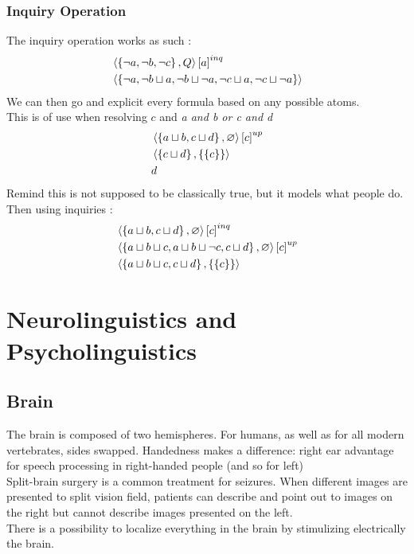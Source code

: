 \documentclass{cours}
\begin{document}
\subsubsection{Inquiry Operation}

The inquiry operation works as such :
\[
    \begin{aligned}
         & \left\langle \left\{\lnot a, \lnot b, \lnot c\right\}, Q \right\rangle\left[a\right]^{inq}                                            \\
         & \left\langle \left\{\lnot a, \lnot b \sqcup a, \lnot b \sqcup \lnot a, \lnot c \sqcup a, \lnot c \sqcup \lnot a\right\} \right\rangle
    \end{aligned}
\]
We can then go and explicit every formula based on any possible atoms. \\
This is of use when resolving $c$ and \textsl{a and b or c and d}
\[
    \begin{aligned}
         & \left\langle \left\{a \sqcup b, c \sqcup d\right\}, \varnothing \right\rangle\left[c\right]^{up} \\
         & \left\langle \left\{c \sqcup d\right\}, \left\{\{c\}\right\} \right\rangle                     \\
         & d
    \end{aligned}
\]
Remind this is not supposed to be classically true, but it models what people do. Then using inquiries :
\[
    \begin{aligned}
         & \left\langle \left\{a \sqcup b, c \sqcup d\right\}, \varnothing \right\rangle\left[c\right]^{inq}                                    \\
         & \left\langle \left\{a \sqcup b \sqcup c, a \sqcup b \sqcup \lnot c, c \sqcup d\right\}, \varnothing \right\rangle\left[c\right]^{up} \\
         & \left\langle \left\{a \sqcup b \sqcup c, c \sqcup d\right\}, \left\{\left\{c\right\}\right\} \right\rangle
    \end{aligned}
\]

\section[Class 11\!: 14/12]{Neurolinguistics and Psycholinguistics}
\subsection{Brain}
The brain is composed of two hemispheres. For humans, as well as for all modern vertebrates, sides swapped. Handedness makes a difference: right ear advantage for speech processing in right-handed people (and so for left)\\
Split-brain surgery is a common treatment for seizures. When different images are presented to split vision field, patients can describe and point out to images on the right but cannot describe images presented on the left.\\
There is a possibility to localize everything in the brain by stimulizing electrically the brain.
\end{document}
